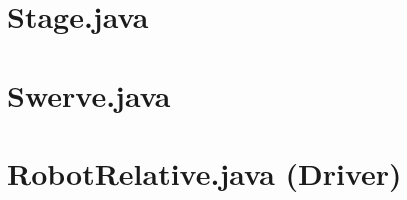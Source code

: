 \documentclass[letterpaper,10pt]{memoir}
\newcommand{\filelister}[1]{%
		
	}
\begin{document}
	\newpage\section*{Stage.java}
	\filelister{Hardware/Stage.java}

	\newpage\section*{Swerve.java}
	\filelister{Hardware/Swerve.java}

	
	\newpage\section*{RobotRelative.java (Driver)}
	\filelister{Driver/RobotRelative.java}



% 
% 
% 
\end{document}
